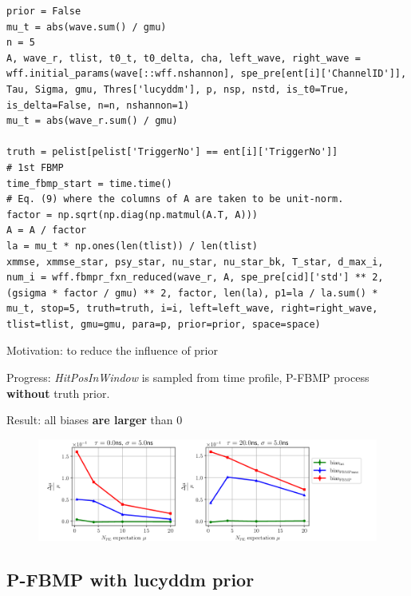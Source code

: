 \documentclass[notitlepage]{article}
\begin{document}
\begin{lstlisting}
prior = False
mu_t = abs(wave.sum() / gmu)
n = 5
A, wave_r, tlist, t0_t, t0_delta, cha, left_wave, right_wave = wff.initial_params(wave[::wff.nshannon], spe_pre[ent[i]['ChannelID']], Tau, Sigma, gmu, Thres['lucyddm'], p, nsp, nstd, is_t0=True, is_delta=False, n=n, nshannon=1)
mu_t = abs(wave_r.sum() / gmu)

truth = pelist[pelist['TriggerNo'] == ent[i]['TriggerNo']]
# 1st FBMP
time_fbmp_start = time.time()
# Eq. (9) where the columns of A are taken to be unit-norm.
factor = np.sqrt(np.diag(np.matmul(A.T, A)))
A = A / factor
la = mu_t * np.ones(len(tlist)) / len(tlist)
xmmse, xmmse_star, psy_star, nu_star, nu_star_bk, T_star, d_max_i, num_i = wff.fbmpr_fxn_reduced(wave_r, A, spe_pre[cid]['std'] ** 2, (gsigma * factor / gmu) ** 2, factor, len(la), p1=la / la.sum() * mu_t, stop=5, truth=truth, i=i, left=left_wave, right=right_wave, tlist=tlist, gmu=gmu, para=p, prior=prior, space=space)
\end{lstlisting}

Motivation: to reduce the influence of prior

Progress: \textit{HitPosInWindow} is sampled from time profile, P-FBMP process \textbf{without} truth prior. 

Result: all biases \textbf{are larger} than 0

\begin{figure}[H]
    \centering
    \includegraphics[width=\textwidth]{vs-biasmu-noprior.png}
\end{figure}

\subsection{P-FBMP with lucyddm prior}
\end{document}
